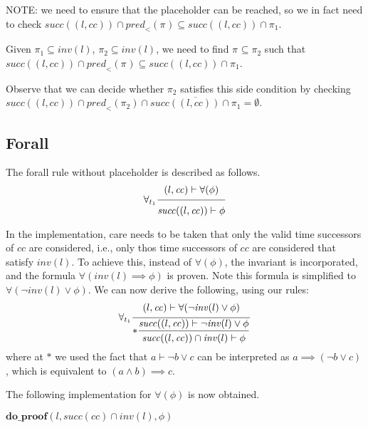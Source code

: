 \documentclass{article}
\newcommand{\proofrule}[3][]{#1 \frac{\raisebox{.7ex}{\normalsize{$#2$}}}
  {\raisebox{-1.0ex}{\normalsize{$#3$}}}}
\newcommand{\placeholder}[1][]{\pi_{#1}}
\newcommand{\loc}{l}
\newcommand{\region}{\mathit{cc}}
\newcommand{\suc}{\mathit{succ}}
\newcommand{\pre}{\mathit{pred}}
\newcommand{\inv}{\mathit{inv}}
\newcommand{\method}[1]{\ensuremath{\mathbf{#1}}}
\begin{document}
{\color{red} NOTE: we need to ensure that the placeholder can be reached, so we in fact need to
check $\suc((\loc, \region)) \cap \pre_{<}(\placeholder) \subseteq \suc((\loc, \region)) \cap \placeholder[1]$.}

Given $\placeholder[1] \subseteq \inv(\loc)$, $\placeholder[2] \subseteq \inv(\loc)$, we need to find $\placeholder \subseteq \placeholder[2]$ such that
$\suc((\loc, \region)) \cap \pre_{<}(\placeholder) \subseteq \suc((\loc, \region)) \cap \placeholder[1]$.

Observe that we can decide whether $\placeholder[2]$ satisfies this side condition by checking $\suc((\loc, \region)) \cap \pre_{<}(\placeholder[2]) \cap \overline{\suc((\loc, \region)) \cap \placeholder[1]} = \emptyset$.

\subsection{Forall}

The forall rule without placeholder is described as follows.
\[
\proofrule[\forall_{t_1}]
{(\loc, \region) \vdash \forall(\phi)}
{\suc((\loc, \region)) \vdash \phi}
\]

In the implementation, care needs to be taken that only the valid time successors of $\region$ are considered,
i.e., only thos time successors of $\region$ are considered that satisfy $\inv(\loc)$. To achieve this,
instead of $\forall(\phi)$, the invariant is incorporated, and the formula $\forall(\inv(\loc) \implies \phi)$
is proven. Note this formula is simplified to $\forall(\lnot \inv(\loc) \lor \phi)$.
We can now derive the following, using our rules:
\[
\proofrule[\forall_{t_1}]
{(\loc, \region) \vdash \forall(\lnot \inv(\loc) \lor \phi)}
{
\proofrule[*]{\suc((\loc, \region)) \vdash \lnot \inv(\loc) \lor \phi}
{\suc((\loc, \region)) \cap \inv(\loc) \vdash \phi
}
}
\]
where at $*$ we used the fact that $a \vdash \lnot b \lor c$ can be interpreted as
$a \implies (\lnot b \lor c)$, which is equivalent to $(a \land b) \implies c$.

The following implementation for $\forall(\phi)$ is now obtained.
\begin{algorithm}[H]
\caption{$\method{do\_proof\_forall}(\loc, \region, \forall(\phi))$}
\begin{algorithmic}
\RETURN $\method{do\_proof}(\loc, \suc(\region) \cap \inv(\loc), \phi)$
\end{algorithmic}
\end{algorithm}
\end{document}
